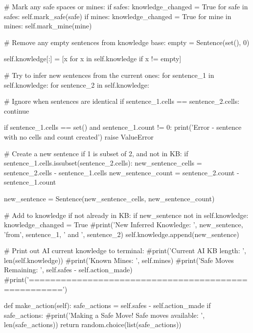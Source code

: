 \documentclass{article} %
\begin{document}
\begin{code}
            # Mark any safe spaces or mines:
            if safes:
                knowledge_changed = True
                for safe in safes:
                    self.mark_safe(safe)
            if mines:
                knowledge_changed = True
                for mine in mines:
                    self.mark_mine(mine)

            # Remove any empty sentences from knowledge base:
            empty = Sentence(set(), 0)

            self.knowledge[:] = [x for x in self.knowledge if x != empty]

            # Try to infer new sentences from the current ones:
            for sentence_1 in self.knowledge:
                for sentence_2 in self.knowledge:

                    # Ignore when sentences are identical
                    if sentence_1.cells == sentence_2.cells:
                        continue

                    if sentence_1.cells == set() and sentence_1.count != 0:
                        print('Error - sentence with no cells and count created')
                        raise ValueError

                    # Create a new sentence if 1 is subset of 2, and not in KB:
                    if sentence_1.cells.issubset(sentence_2.cells):
                        new_sentence_cells = sentence_2.cells - sentence_1.cells
                        new_sentence_count = sentence_2.count - sentence_1.count

                        new_sentence = Sentence(new_sentence_cells, new_sentence_count)

                        # Add to knowledge if not already in KB:
                        if new_sentence not in self.knowledge:
                            knowledge_changed = True
                            #print('New Inferred Knowledge: ', new_sentence, 'from', sentence_1, ' and ', sentence_2)
                            self.knowledge.append(new_sentence)

        # Print out AI current knowledge to terminal:
        #print('Current AI KB length: ', len(self.knowledge))
        #print('Known Mines: ', self.mines)
        #print('Safe Moves Remaining: ', self.safes - self.action_made)
        #print('====================================================')

    def make_action(self):
        safe_actions = self.safes - self.action_made
        if safe_actions:
            #print('Making a Safe Move! Safe moves available: ', len(safe_actions))
            return random.choice(list(safe_actions))


\end{code}
\end{document}
